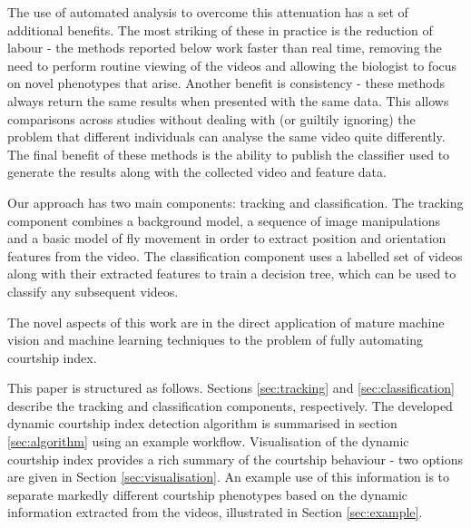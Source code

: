 \documentclass[twocolumn]{article}
\newcommand{\todo}[1]{\textsf{\emph{\textbf{\textcolor{red}{#1}}}}}
\begin{document}

The use of automated analysis to overcome this attenuation has a set of additional benefits. The most striking of these in practice is the reduction of labour - the methods reported below work faster than real time, removing the need to perform routine viewing of the videos and allowing the biologist to focus on novel phenotypes that arise. Another benefit is consistency - these methods always return the same results when presented with the same data. This allows comparisons across studies without dealing with (or guiltily ignoring) the problem that different individuals can analyse the same video quite differently. The final benefit of these methods is the ability to publish the classifier used to generate the results along with the collected video and feature data.

Our approach has two main components: tracking and classification. The tracking component combines a background model, a sequence of image manipulations and a basic model of fly movement in order to extract position and orientation features from the video. The classification component uses a labelled set of videos along with their extracted features to train a decision tree, which can be used to classify any subsequent videos. 

The novel aspects of this work are in the direct application of mature machine vision and machine learning techniques to the problem of fully automating courtship index.


This paper is structured as follows. Sections \ref{sec:tracking} and \ref{sec:classification} describe the tracking and classification components, respectively. The developed dynamic courtship index detection algorithm is summarised in section \ref{sec:algorithm} using an example workflow. Visualisation of the dynamic courtship index provides a rich summary of the courtship behaviour - two options are given in Section \ref{sec:visualisation}. An example use of this information is to separate markedly different courtship phenotypes based on the dynamic information extracted from the videos, illustrated in Section \ref{sec:example}.
\end{document}
